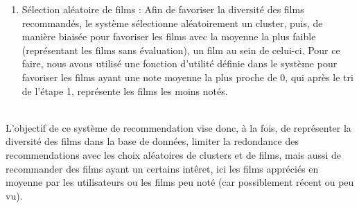 \documentclass{article}
\begin{document}
\begin{itemize}
\begin{enumerate}
              \item Sélection aléatoire de films : Afin de favoriser la diversité des films recommandés, le système sélectionne aléatoirement un cluster, puis, de manière biaisée pour favoriser les films avec la moyenne la plus faible (représentant les films sans évaluation), un film au sein de celui-ci.
                    Pour ce faire, nous avons utilisé une fonction d'utilité définie dans le système pour favoriser les films ayant une note moyenne la plus proche de 0, qui après le tri de l'étape 1, représente les films les moins notés.
          \end{enumerate}
          $ $\\
          L'objectif de ce système de recommendation vise donc, à la fois, de représenter la diversité des films dans la base de données, limiter la redondance des recommendations avec les choix aléatoires de clusters et de films, mais aussi de recommander des films
          ayant un certains intêret, ici les films appréciés en moyenne par les utilisateurs ou les films peu noté (car possiblement récent ou peu vu).\\

\end{itemize}
\end{document}
